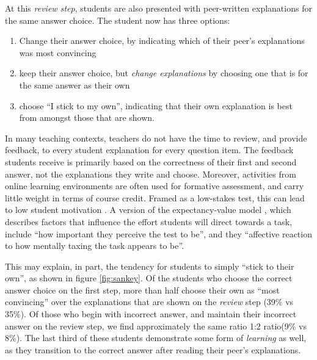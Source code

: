 \documentclass[sigconf]{acmart}
\begin{document}
At this \textit{review step}, students are also 
presented with peer-written 
explanations for the same answer choice. 
The student now has three options:
\begin{enumerate}
	\item Change their answer choice, by 
	indicating which of their peer's 
	explanations was most convincing
	\item keep their answer choice, but 
	\textit{change explanations} by 
	choosing one that is for the same answer as 
	their own
	\item choose ``I stick to my own'', indicating 
	that their own explanation 
	is best from amongst those that are shown.
\end{enumerate}

In many teaching contexts, teachers do not have 
the time to review, and provide 
feedback, to every student explanation for every 
question item. 
The feedback students receive is primarily based 
on the correctness of their 
first and second answer, not the explanations they 
write and choose.
Moreover, activities from online learning 
environments are often used for 
formative assessment, and carry little weight in 
terms of course credit. Framed 
as a low-stakes test, this can lead to low student 
motivation 
\cite{wise_low_2005}. 
A version of the expectancy-value model 
\cite{pintrich_dynamic_1989}, which 
describes factors that influence 
the effort students will direct towards a task, 
include ``how important they 
perceive the test to be'', and they ``affective 
reaction to how mentally taxing 
the task appears to 
be''\cite{wolf_consequence_1995}.

This may explain, in part, the tendency for 
students to simply ``stick to their 
own'', as shown in figure \ref{fig:sankey}. 
Of the students who choose the correct answer 
choice on the first step, more 
than half choose their own as ``most convincing'' 
over the explanations that 
are shown on the \textit{review} step (39\% vs 
35\%).
Of those who begin with incorrect answer, and 
maintain their 
incorrect answer 
on the review step, we find approximately the same 
ratio 1:2 
ratio(9\% vs 8\%).
The last third of these students demonstrate some 
form of 
\textit{learning} as 
well, as they transition to the correct answer 
after reading 
their peer's 
explanations.
\end{document}
